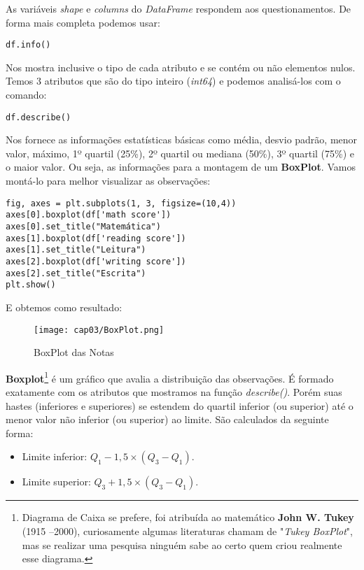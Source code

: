 As variáveis \textit{shape} e \textit{columns} do \textit{DataFrame} respondem aos questionamentos. De forma mais completa podemos usar:
\begin{lstlisting}[]
df.info()
\end{lstlisting}

Nos mostra inclusive o tipo de cada atributo e se contém ou não elementos nulos. Temos 3 atributos que são do tipo inteiro (\textit{int64}) e podemos analisá-los com o comando:
\begin{lstlisting}[]
df.describe()
\end{lstlisting}

Nos fornece as informações estatísticas básicas como média, desvio padrão, menor valor, máximo, 1º quartil (25\%), 2º quartil ou mediana (50\%), 3º quartil (75\%) e o maior valor. Ou seja, as informações para a montagem de um \textbf{BoxPlot}. Vamos montá-lo para melhor visualizar as observações:
\begin{lstlisting}[]
fig, axes = plt.subplots(1, 3, figsize=(10,4))
axes[0].boxplot(df['math score'])
axes[0].set_title("Matemática")
axes[1].boxplot(df['reading score'])
axes[1].set_title("Leitura")
axes[2].boxplot(df['writing score'])
axes[2].set_title("Escrita")
plt.show()
\end{lstlisting}

E obtemos como resultado:
\begin{figure}[H]
	\centering
	\texttt{[image: cap03/BoxPlot.png]}
	\caption{BoxPlot das Notas}
\end{figure}

\textbf{Boxplot}\footnote{Diagrama de Caixa se prefere, foi atribuída ao matemático \textbf{John W. Tukey} (1915 –2000), curiosamente algumas literaturas chamam de "\textit{Tukey BoxPlot}", mas se realizar uma pesquisa ninguém sabe ao certo quem criou realmente esse diagrama.} é um gráfico que avalia a distribuição das observações. É formado exatamente com os atributos que mostramos na função \textit{describe()}. Porém suas hastes (inferiores e superiores) se estendem do quartil inferior (ou superior) até o menor valor não inferior (ou superior) ao limite. São calculados da seguinte forma: \vspace{-1em}
\begin{itemize}
	\item Limite inferior: $Q_1 - 1,5 \times (Q_3 - Q_1)$.
	\item Limite superior: $Q_3 + 1,5 \times (Q_3 - Q_1)$.
\end{itemize}

